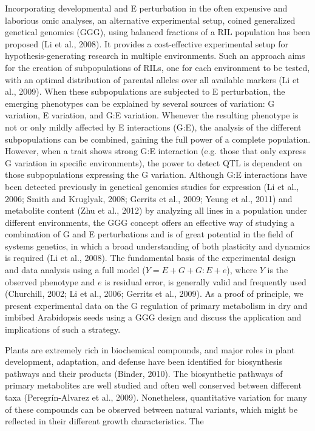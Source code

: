 Incorporating developmental and E  perturbation in the often expensive and laborious omic analyses, an 
alternative experimental setup, coined generalized genetical genomics (GGG), using balanced fractions 
of a RIL population has been proposed (Li et al., 2008). It provides a cost-effective experimental setup 
for hypothesis-generating research in multiple environments. Such an approach aims for the creation of 
subpopulations of RILs, one for each environment to be tested, with an optimal distribution of parental 
alleles over all available markers (Li et al., 2009). When these subpopulations are subjected to E 
perturbation, the emerging phenotypes can be explained by several sources of variation: G variation, 
E variation, and G:E variation. Whenever the resulting phenotype is not or only mildly affected by E 
interactions (G:E), the analysis of the different subpopulations can be combined, gaining the full power 
of a complete population. However, when a trait shows strong G:E interaction (e.g. those that only express G variation in specific 
environments), the power to detect QTL is dependent on those subpopulations expressing the G variation. 
Although G:E interactions have been detected previously in genetical genomics studies for expression 
(Li et al., 2006; Smith and Kruglyak, 2008; Gerrits et al., 2009; Yeung et al., 2011) and metabolite 
content (Zhu et al., 2012) by analyzing all lines in a population under different environments, the 
GGG concept offers an effective way of studying a combination of G and E perturbations and is of great 
potential in the field of systems genetics, in which a broad understanding of both plasticity and
dynamics is required (Li et al., 2008). The fundamental basis of the experimental design and data 
analysis using a full model ($Y = E + G + G:E + e$), where $Y$ is the observed phenotype and $e$
is residual error, is generally valid and frequently used (Churchill, 2002; Li et al., 2006; Gerrits
et al., 2009). As a proof of principle, we present experimental data on the G regulation of primary 
metabolism in dry and imbibed Arabidopsis seeds using a GGG design and discuss the application and 
implications of such a strategy.

Plants are extremely rich in biochemical compounds, and major roles in plant development, adaptation, 
and defense have been identified for biosynthesis pathways and their products (Binder, 2010). The 
biosynthetic pathways of primary metabolites are well studied and often well conserved between 
different taxa (Peregrín-Alvarez et al., 2009). Nonetheless, quantitative variation for many of 
these compounds can be observed between natural variants, which might be reflected in their different 
growth characteristics. The

